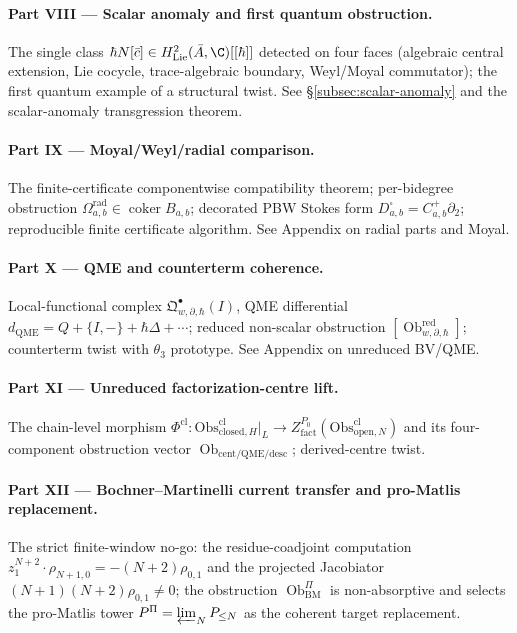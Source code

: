 \paragraph{Part VIII --- Scalar anomaly and first quantum obstruction.}
The single class \(\hbar N[\bar c]\in H^2_{\mathrm{Lie}}(\bar A,\C)[[\hbar]]\)
detected on four faces (algebraic central extension, Lie cocycle,
trace-algebraic boundary, Weyl/Moyal commutator); the first quantum
example of a structural twist.  See
\S\ref{subsec:scalar-anomaly} and the scalar-anomaly transgression
theorem.

\paragraph{Part IX --- Moyal/Weyl/radial comparison.}  The
finite-certificate componentwise compatibility theorem; per-bidegree
obstruction \(\Omega^{\mathrm{rad}}_{a,b}\in\operatorname{coker}B_{a,b}\);
decorated PBW Stokes form
\(D^\square_{a,b}=C^+_{a,b}\partial_2\); reproducible finite
certificate algorithm.  See Appendix on radial parts and Moyal.

\paragraph{Part X --- QME and counterterm coherence.}  Local-functional
complex \(\mathfrak Q^\bullet_{w,\partial,\hbar}(I)\), QME
differential \(d_{\mathrm{QME}}=Q+\{I,-\}+\hbar\Delta+\cdots\); reduced
non-scalar obstruction
\([\operatorname{Ob}^{\mathrm{red}}_{w,\partial,\hbar}]\); counterterm
twist with \(\theta_3\) prototype.  See Appendix on unreduced BV/QME.

\paragraph{Part XI --- Unreduced factorization-centre lift.}  The
chain-level morphism
\(\Phi^{\mathrm{cl}}\colon\mathrm{Obs}^{\mathrm{cl}}_{\mathrm{closed},H}\big|_L
\to Z^{P_0}_{\mathrm{fact}}(\mathrm{Obs}^{\mathrm{cl}}_{\mathrm{open},N})\)
and its four-component obstruction vector
\(\operatorname{Ob}_{\mathrm{cent/QME/desc}}\); derived-centre twist.

\paragraph{Part XII --- Bochner--Martinelli current transfer and pro-Matlis replacement.}
The strict finite-window no-go: the residue-coadjoint computation
\(z_1^{N+2}\cdot\rho_{N+1,0}=-(N+2)\rho_{0,1}\) and the projected
Jacobiator \((N+1)(N+2)\rho_{0,1}\ne 0\); the obstruction
\(\operatorname{Ob}^{\Pi}_{\mathrm{BM}}\) is non-absorptive and
selects the pro-Matlis tower
\(P^\Pi=\varprojlim_N P_{\le N}\) as the coherent target replacement.

